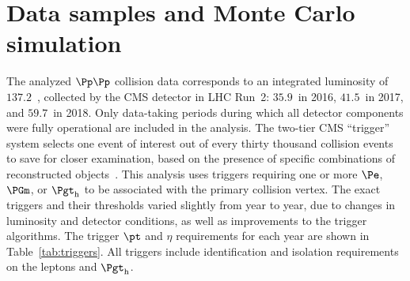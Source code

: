 \section{Data samples and Monte Carlo simulation}
\label{sec:datasets}

The analyzed $\Pp\Pp$ collision data corresponds to an integrated luminosity of $137.2$~\fbinv,
collected by the CMS detector in LHC Run~2:
$35.9$~\fbinv in 2016, $41.5$~\fbinv in 2017, and $59.7$~\fbinv in 2018.
Only data-taking periods during which all detector components were fully operational are included in the analysis.
The two-tier CMS ``trigger'' system selects one event of interest out of every thirty
thousand collision events to save for closer examination, based on the presence of
specific combinations of reconstructed objects~\cite{Khachatryan:2016bia,Sirunyan:2020zal}.  This analysis
uses triggers requiring one or more $\Pe$, $\PGm$, or $\tauh$
to be associated with the primary collision vertex. The exact triggers and their
thresholds varied slightly from year to year, due to changes in luminosity and detector
conditions, as well as improvements to the trigger algorithms.  The trigger $\pt$ and
$\eta$ requirements for each year are shown in Table~\ref{tab:triggers}.  All
triggers include identification and isolation requirements on the leptons and $\tauh$.

